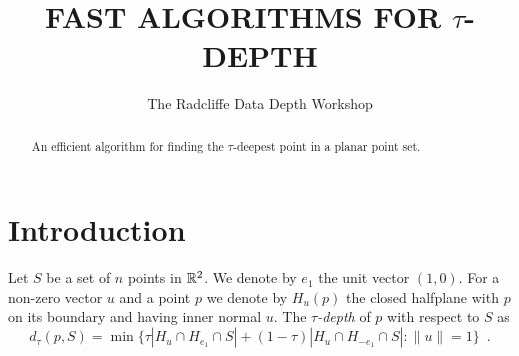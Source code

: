 \documentclass[lotsofwhite]{patmorin}
\title{\MakeUppercase{Fast Algorithms for $\tau$-Depth}}
\author{The Radcliffe Data Depth Workshop}
\date{}
\newcommand{\taudepth}{$\tau$-depth}
\newcommand{\tdepth}{d_\tau}
\begin{document}
\maketitle
\begin{abstract}
An efficient algorithm for finding the $\tau$-deepest point
in a planar point set.
\end{abstract}

\section{Introduction}

Let $S$ be a set of $n$ points in $\mathbb{R}^2$.  We denote by $e_1$ the unit vector
$(1,0)$.  For a non-zero vector $u$ and a point $p$ we denote by $H_u(p)$ the
closed halfplane with $p$ on its boundary and having inner normal $u$.
The \emph{\taudepth} of $p$ with respect to $S$ as
\[
    \tdepth(p,S) = \min\{ \tau|H_u\cap H_{e_1}\cap S| 
           + (1-\tau)|H_u\cap H_{-e_1}\cap S|: \|u\|=1\} \enspace .
\]
\end{document}
